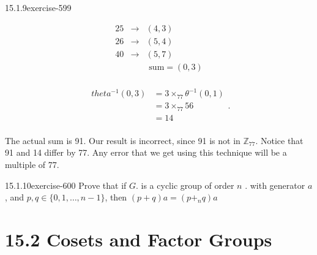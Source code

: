\documentclass[twoside,10pt,]{book}
\numberwithin{equation}{section}
\begin{document}
\begin{divisionsolution}{15.1.9}{}{exercise-599}
\begin{enumerate}[label=(\alph*)]
\begin{equation*}
\begin{array}{ccc}
25 & \to  & (4,3) \\
26 & \to  & (5,4) \\
40 & \to  & (5,7) \\
&   & \textrm{ sum}=(0,3) \\
\end{array}
\end{equation*}
%
\par
\hypertarget{p-5366}{}%
%
\begin{equation*}
\begin{split}
theta ^{-1}(0,3) &= 3 \times_{77}\theta ^{-1}(0,1)\\
& = 3\times_{77} 56\\ 
& =14\\
\end{split}\text{.}
\end{equation*}
%
\par
\hypertarget{p-5367}{}%
The actual sum is 91. Our result is incorrect, since 91 is not in \(\mathbb{Z}_{77}\).  Notice that 91 and 14 differ by 77. Any error that we get using this technique will be a multiple of 77.%
\end{enumerate}
%
\end{divisionsolution}%
\begin{divisionsolution}{15.1.10}{}{exercise-600}%
\hypertarget{p-5368}{}%
Prove that if \(G\). is a cyclic group of order \(n\) . with generator \(a\), and \(p, q \in  \{0, 1, \ldots , n - 1\}\), then \((p+q)a = \left(p+_nq\right)a\)%
\end{divisionsolution}%
\section*{15.2 Cosets and Factor Groups}
\end{document}

